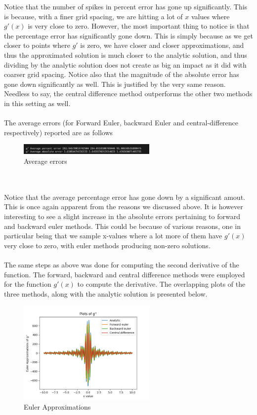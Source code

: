 \documentclass[12pt]{article}
\begin{document}
Notice that the number of spikes in percent error has gone up significantly. This is because, with a finer grid spacing, we are hitting a lot of $x$ values where $g'(x)$ is very close to zero. However, the most important thing to notice is that the percentage error has significantly gone down. This is simply because as we get closer to points where $g'$ is zero, we have closer and closer approximations, and thus the approximated solution is much closer to the analytic solution, and thus dividing by the analytic solution does not create as big an impact as it did with coarser grid spacing. Notice also that the magnitude of the absolute error has gone down significantly as well. This is justified by the very same reason. Needless to say, the central difference method outperforms the other two methods in this setting as well. \\\\
The average errors (for Forward Euler, backward Euler and central-difference respectively) reported are as follows 
\begin{figure}[h]
	\centering
	\includegraphics[width=0.60\textwidth]{errorgpr400.png}
	\caption{Average errors}
\end{figure}\\\\
Notice that the average percentage error has gone down by a significant amout. This is once again apparent from the reasons we discussed above. It is however interesting to see a slight increase in the absolute errors pertaining to forward and backward euler methods. This could be because of various reasons, one in particular being that we sample x-values where a lot more of them have $g'(x)$ very close to zero, with euler methods producing non-zero solutions. 
\\\\
The same steps as above was done for computing the second derivative of the function. The forward, backward and central difference methods were employed for the function $g'(x)$ to compute the derivative. The overlapping plots of the three methods, along with the analytic solution is presented below. 
\begin{figure}[h]
	\centering
	\includegraphics[width=0.60\textwidth]{gdprimeeulerplot400.png}
	\caption{Euler Approximations}
\end{figure}\\\\
\end{document}
